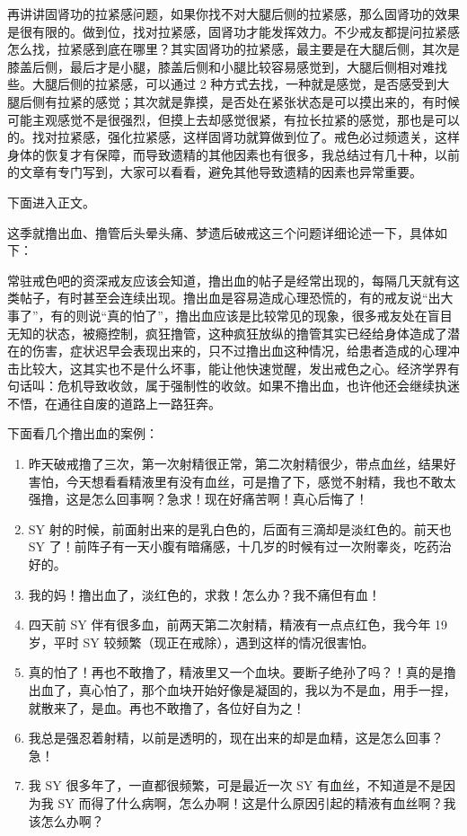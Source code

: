 \documentclass[fontset=founder]{ctexart}
\begin{document}
再讲讲固肾功的拉紧感问题，如果你找不对大腿后侧的拉紧感，那么固肾功的效果是很有限的。做到位，找对拉紧感，固肾功才能发挥效力。不少戒友都提问拉紧感怎么找，拉紧感到底在哪里？其实固肾功的拉紧感，最主要是在大腿后侧，其次是膝盖后侧，最后才是小腿，膝盖后侧和小腿比较容易感觉到，大腿后侧相对难找些。大腿后侧的拉紧感，可以通过 2 种方式去找，一种就是感觉，是否感受到大腿后侧有拉紧的感觉；其次就是靠摸，是否处在紧张状态是可以摸出来的，有时候可能主观感觉不是很强烈，但摸上去却感觉很紧，有拉长拉紧的感觉，那也是可以的。找对拉紧感，强化拉紧感，这样固肾功就算做到位了。戒色必过频遗关，这样身体的恢复才有保障，而导致遗精的其他因素也有很多，我总结过有几十种，以前的文章有专门写到，大家可以看看，避免其他导致遗精的因素也异常重要。

下面进入正文。

这季就撸出血、撸管后头晕头痛、梦遗后破戒这三个问题详细论述一下，具体如下：

常驻戒色吧的资深戒友应该会知道，撸出血的帖子是经常出现的，每隔几天就有这类帖子，有时甚至会连续出现。撸出血是容易造成心理恐慌的，有的戒友说“出大事了”，有的则说“真的怕了”，撸出血应该是比较常见的现象，很多戒友处在盲目无知的状态，被瘾控制，疯狂撸管，这种疯狂放纵的撸管其实已经给身体造成了潜在的伤害，症状迟早会表现出来的，只不过撸出血这种情况，给患者造成的心理冲击比较大，这其实也不是什么坏事，能让他快速觉醒，发出戒色之心。经济学界有句话叫：危机导致收敛，属于强制性的收敛。如果不撸出血，也许他还会继续执迷不悟，在通往自废的道路上一路狂奔。

下面看几个撸出血的案例：

\begin{enumerate}
    \item 昨天破戒撸了三次，第一次射精很正常，第二次射精很少，带点血丝，结果好害怕，今天想看看精液里有没有血丝，可是撸了下，感觉不射精，我也不敢太强撸，这是怎么回事啊？急求！现在好痛苦啊！真心后悔了！
    \item SY 射的时候，前面射出来的是乳白色的，后面有三滴却是淡红色的。前天也 SY 了！前阵子有一天小腹有暗痛感，十几岁的时候有过一次附睾炎，吃药治好的。
    \item 我的妈！撸出血了，淡红色的，求救！怎么办？我不痛但有血！
    \item 四天前 SY 伴有很多血，前两天第二次射精，精液有一点点红色，我今年 19 岁，平时 SY 较频繁（现正在戒除），遇到这样的情况很害怕。
    \item 真的怕了！再也不敢撸了，精液里又一个血块。要断子绝孙了吗？！真的是撸出血了，真心怕了，那个血块开始好像是凝固的，我以为不是血，用手一捏，就散来了，是血。再也不敢撸了，各位好自为之！
    \item 我总是强忍着射精，以前是透明的，现在出来的却是血精，这是怎么回事？急！
    \item 我 SY 很多年了，一直都很频繁，可是最近一次 SY 有血丝，不知道是不是因为我 SY 而得了什么病啊，怎么办啊！这是什么原因引起的精液有血丝啊？我该怎么办啊？
\end{enumerate}
\end{document}
